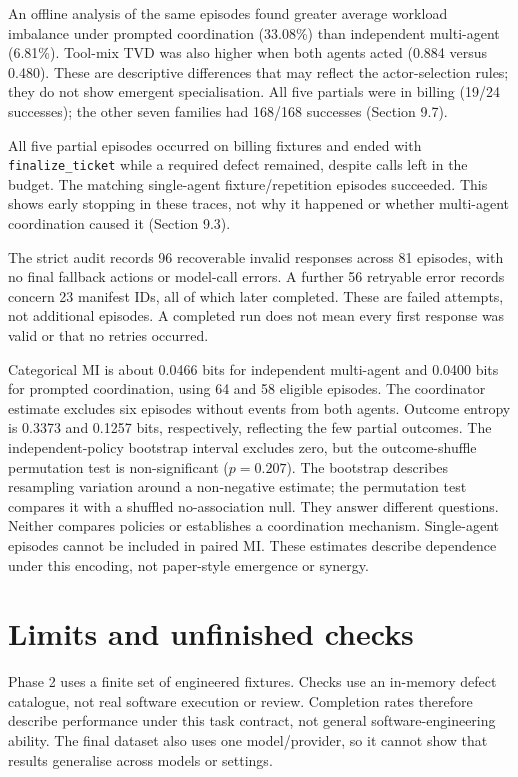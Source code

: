 \documentclass[12pt,a4paper,oneside]{report}
\begin{document}
An offline analysis of the same episodes found greater average workload imbalance under prompted coordination (33.08\%) than independent multi-agent (6.81\%). Tool-mix TVD was also higher when both agents acted (0.884 versus 0.480). These are descriptive differences that may reflect the actor-selection rules; they do not show emergent specialisation. All five partials were in billing (19/24 successes); the other seven families had 168/168 successes (Section 9.7).

All five partial episodes occurred on billing fixtures and ended with \texttt{finalize\allowbreak\_ticket} while a required defect remained, despite calls left in the budget. The matching single-agent fixture/repetition episodes succeeded. This shows early stopping in these traces, not why it happened or whether multi-agent coordination caused it (Section 9.3).

The strict audit records 96 recoverable invalid responses across 81 episodes, with no final fallback actions or model-call errors. A further 56 retryable error records concern 23 manifest IDs, all of which later completed. These are failed attempts, not additional episodes. A completed run does not mean every first response was valid or that no retries occurred.

Categorical MI is about 0.0466 bits for independent multi-agent and 0.0400 bits for prompted coordination, using 64 and 58 eligible episodes. The coordinator estimate excludes six episodes without events from both agents. Outcome entropy is 0.3373 and 0.1257 bits, respectively, reflecting the few partial outcomes. The independent-policy bootstrap interval excludes zero, but the outcome-shuffle permutation test is non-significant (\(p=0.207\)). The bootstrap describes resampling variation around a non-negative estimate; the permutation test compares it with a shuffled no-association null. They answer different questions. Neither compares policies or establishes a coordination mechanism. Single-agent episodes cannot be included in paired MI. These estimates describe dependence under this encoding, not paper-style emergence or synergy.

\section{Limits and unfinished checks}
Phase 2 uses a finite set of engineered fixtures. Checks use an in-memory defect catalogue, not real software execution or review. Completion rates therefore describe performance under this task contract, not general software-engineering ability. The final dataset also uses one model/provider, so it cannot show that results generalise across models or settings.
\end{document}
